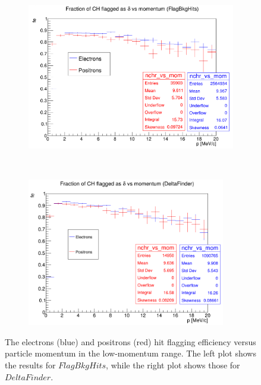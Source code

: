     \begin{figure}[!h]
        \centering
        \begin{subfigure}[t]{0.5\textwidth}
            \centering
            \includegraphics[width=1.\textwidth]{figures/png/Screenshot_20240818_155835.png}
            \caption{}
            \label{fig:eff1}
        \end{subfigure}%
        ~ 
        \begin{subfigure}[t]{0.5\textwidth}
            \centering
            \includegraphics[width=0.95\textwidth]{figures/png/Screenshot_20240813_203916.png}
            \caption{}
            \label{fig:eff2}
        \end{subfigure}
        \caption[The electrons (blue) and positrons (red) hit flagging efficiency versus 
        particle momentum in the low-momentum range.]{The electrons 
        (blue) and positrons (red) hit flagging efficiency versus 
        particle momentum in the low-momentum range. The left plot shows the 
        results for $FlagBkgHits$, while the right plot shows those for $DeltaFinder$.
        }
        \label{fig:efficiency}
      \end{figure} 

